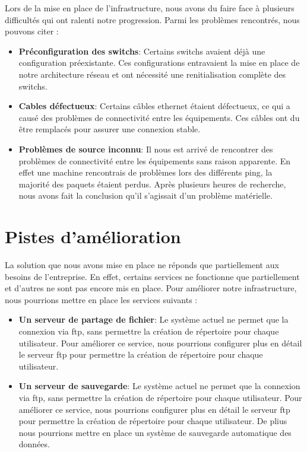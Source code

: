 \documentclass[a4paper,12pt]{report}
\begin{document}
            Lors de la mise en place de l'infrastructure, nous avons du faire face à plusieurs difficultés qui ont ralenti notre progression. Parmi les problèmes rencontrés, nous pouvons citer :

            \begin{itemize}
                \item \textbf{Préconfiguration des switchs}: Certains switchs avaient déjà une configuration préexistante. Ces configurations entravaient la mise en place de notre architecture réseau et ont nécessité une renitialisation complète des switchs.
                \item \textbf{Cables défectueux}: Certains câbles ethernet étaient défectueux, ce qui a causé des problèmes de connectivité entre les équipements. Ces câbles ont du être remplacés pour assurer une connexion stable.
                \item \textbf{Problèmes de source inconnu}: Il nous est arrivé de rencontrer des problèmes de connectivité entre les équipements sans raison apparente. En effet une machine rencontrais de problèmes lors des différents ping, la majorité des paquets étaient perdus. Après plusieurs heures de recherche, nous avons fait la conclusion qu'il s'agissait d'un problème matérielle.
            \end{itemize}

        \section{Pistes d'amélioration}
            La solution que nous avons mise en place ne réponds que partiellement aux besoins de l'entreprise. En effet, certains services ne fonctionne que partiellement et d'autres ne sont pas encore mis en place. Pour améliorer notre infrastructure, nous pourrions mettre en place les services suivants :

            \begin{itemize}
                \item \textbf{Un serveur de partage de fichier}: Le système actuel ne permet que la connexion via ftp, sans permettre la création de répertoire pour chaque utilisateur. Pour améliorer ce service, nous pourrions configurer plus en détail le serveur ftp pour permettre la création de répertoire pour chaque utilisateur.
                \item \textbf{Un serveur de sauvegarde}: Le système actuel ne permet que la connexion via ftp, sans permettre la création de répertoire pour chaque utilisateur. Pour améliorer ce service, nous pourrions configurer plus en détail le serveur ftp pour permettre la création de répertoire pour chaque utilisateur. De plius nous pourrions mettre en place un système de sauvegarde automatique des données.
            \end{itemize} 
\end{document}
